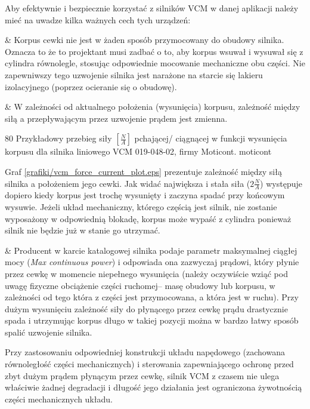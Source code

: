 \clearpage

Aby efektywnie i bezpiecznie korzystać z silników VCM w danej aplikacji należy mieć na uwadze kilka ważnych cech tych urządzeń:

\begin{easylist}
	& Korpus cewki nie jest w żaden sposób przymocowany do obudowy silnika. Oznacza to że to projektant musi zadbać o to, aby korpus wsuwał i wysuwał się z cylindra równolegle, stosując odpowiednie mocowanie mechaniczne obu części. Nie zapewniwszy tego uzwojenie silnika jest narażone na starcie się lakieru izolacyjnego (poprzez ocieranie się o obudowę). 
	
	& W zależności od aktualnego położenia (wysunięcia) korpusu, zależność między siłą a przepływającym przez uzwojenie prądem jest zmienna.
	
		{80}
		{Przykładowy przebieg siły $ [\frac{N}{A}] $ pchającej/ ciągnącej w funkcji wysunięcia korpusu dla silnika liniowego VCM 019-048-02, firmy Moticont.}
		{moticont}
	
Graf \ref{grafiki/vcm_force_current_plot.eps} prezentuje zależność między siłą silnika a położeniem jego cewki. Jak widać największa i stała siła ($ 2 \frac{N}{A} $) występuje dopiero kiedy korpus jest trochę wysunięty i zaczyna  spadać przy końcowym wysuwie. Jeżeli układ mechaniczny, którego częścią jest silnik, nie zostanie wyposażony w odpowiednią blokadę, korpus może wypaść z cylindra ponieważ silnik nie będzie już w stanie go utrzymać.

	& Producent w karcie katalogowej silnika podaje parametr maksymalnej ciągłej mocy ({\em Max continuous power}) i odpowiada ona zazwyczaj prądowi, który płynie przez cewkę w momencie niepełnego wysunięcia (należy oczywiście wziąć pod uwagę fizyczne obciążenie części ruchomej-- masę obudowy lub korpusu, w zależności od tego która z części jest przymocowana, a która jest w ruchu). Przy dużym wysunięciu zależność siły do płynącego przez cewkę prądu drastycznie spada i utrzymując korpus długo w takiej pozycji można w bardzo łatwy sposób spalić uzwojenie silnika. \\
	
\end{easylist}

Przy zastosowaniu odpowiedniej konstrukcji układu napędowego (zachowana równoległość części mechanicznych) i sterowania zapewniającego ochronę przed zbyt dużym prądem płynącym przez cewkę, silnik VCM z czasem nie ulega właściwie żadnej degradacji i długość jego działania jest ograniczona żywotnością części mechanicznych układu.









